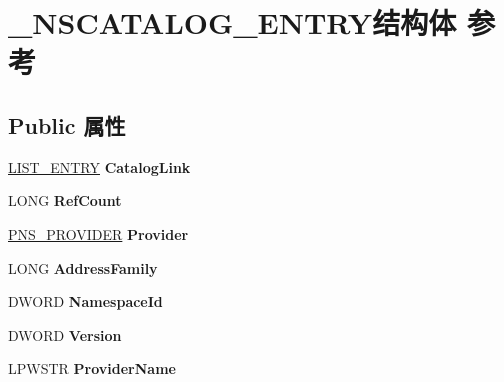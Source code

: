 \hypertarget{struct___n_s_c_a_t_a_l_o_g___e_n_t_r_y}{}\section{\+\_\+\+N\+S\+C\+A\+T\+A\+L\+O\+G\+\_\+\+E\+N\+T\+R\+Y结构体 参考}
\label{struct___n_s_c_a_t_a_l_o_g___e_n_t_r_y}
\subsection*{Public 属性}
\begin{DoxyCompactItemize}
\item 
\mbox{\label{struct___n_s_c_a_t_a_l_o_g___e_n_t_r_y_a55a7f5120abc5eff9b8ab618f19e3f72}} 
\hyperlink{struct___l_i_s_t___e_n_t_r_y}{L\+I\+S\+T\+\_\+\+E\+N\+T\+RY} {\bfseries Catalog\+Link}
\item 
\mbox{\label{struct___n_s_c_a_t_a_l_o_g___e_n_t_r_y_a7ad76ab817360b5eb060669d5045adc5}} 
L\+O\+NG {\bfseries Ref\+Count}
\item 
\mbox{\label{struct___n_s_c_a_t_a_l_o_g___e_n_t_r_y_af8a06cee0c5c566bf65e71c105390216}} 
\hyperlink{struct___n_s_p_r_o_v_i_d_e_r}{P\+N\+S\+\_\+\+P\+R\+O\+V\+I\+D\+ER} {\bfseries Provider}
\item 
\mbox{\label{struct___n_s_c_a_t_a_l_o_g___e_n_t_r_y_ab04ee4ea476cd059feeabca406417afd}} 
L\+O\+NG {\bfseries Address\+Family}
\item 
\mbox{\label{struct___n_s_c_a_t_a_l_o_g___e_n_t_r_y_acc0a86ef4771ad3f542aeccdc5343b5b}} 
D\+W\+O\+RD {\bfseries Namespace\+Id}
\item 
\mbox{\label{struct___n_s_c_a_t_a_l_o_g___e_n_t_r_y_a9f370c8a989cda0b40504fa1a285639f}} 
D\+W\+O\+RD {\bfseries Version}
\item 
\mbox{\label{struct___n_s_c_a_t_a_l_o_g___e_n_t_r_y_a7957adf3130d1794c8ffccfc4e78efa1}} 
L\+P\+W\+S\+TR {\bfseries Provider\+Name}

\end{DoxyCompactItemize}
